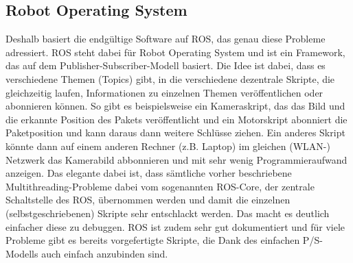 \subsection{Robot Operating System}
Deshalb basiert die endgültige Software auf ROS, das genau diese Probleme adressiert. ROS steht dabei für Robot Operating System und ist ein Framework, das auf dem Publisher-Subscriber-Modell basiert. Die Idee ist dabei, dass es verschiedene Themen (Topics) gibt, in die verschiedene dezentrale Skripte, die gleichzeitig laufen, Informationen zu einzelnen Themen veröffentlichen oder abonnieren können. So gibt es beispielsweise ein Kameraskript, das das Bild und die erkannte Position des Pakets veröffentlicht und ein Motorskript abonniert die Paketposition und kann daraus dann weitere Schlüsse ziehen. Ein anderes Skript könnte dann auf einem anderen Rechner (z.B. Laptop) im gleichen (WLAN-) Netzwerk das Kamerabild abbonnieren und mit sehr wenig Programmieraufwand anzeigen. Das elegante dabei ist, dass sämtliche vorher beschriebene Multithreading-Probleme dabei vom sogenannten ROS-Core, der zentrale Schaltstelle des ROS, übernommen werden und damit die einzelnen (selbstgeschriebenen) Skripte sehr entschlackt werden. Das macht es deutlich einfacher diese zu debuggen. ROS ist zudem sehr gut dokumentiert und für viele Probleme gibt es bereits vorgefertigte Skripte, die Dank des einfachen P/S-Modells auch einfach anzubinden sind.

